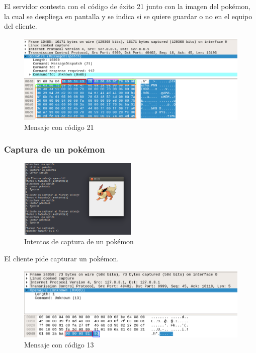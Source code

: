 \documentclass[12pt]{article}
\begin{document}
El servidor contesta con el código de éxito 21 junto con la imagen del pokémon, la cual se despliega en pantalla y se indica si se quiere guardar o no en el equipo del cliente.
\begin{figure}[H]
  \centering
  \includegraphics[width=\textwidth]{13}
  \caption{Mensaje con código 21}
\end{figure}

\subsubsection{Captura de un pokémon}

\begin{figure}[H]
  \centering
  \includegraphics[width=0.5\textwidth]{14}
  \caption{Intentos de captura de un pokémon}
\end{figure}

El cliente pide capturar un pokémon.

\begin{figure}[H]
  \centering
  \includegraphics[width=\textwidth]{15}
  \caption{Mensaje con código 13}
\end{figure}
\end{document}
